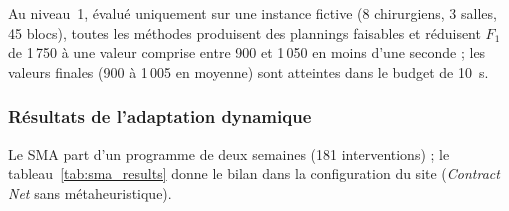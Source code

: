 \documentclass[11pt,a4paper]{article}
\begin{document}
Au niveau~1, évalué uniquement sur une instance fictive (8 chirurgiens, 3 salles, 45 blocs), toutes les méthodes produisent des plannings faisables et réduisent $F_1$ de 1\,750 à une valeur comprise entre 900 et 1\,050 en moins d'une seconde ; les valeurs finales (900 à 1\,005 en moyenne) sont atteintes dans le budget de 10~s.

\subsubsection{Résultats de l'adaptation dynamique}

Le SMA part d'un programme de deux semaines (181 interventions) ; le tableau~\ref{tab:sma_results} donne le bilan dans la configuration du site (\emph{Contract Net} sans métaheuristique).

\begin{table}[htbp]
\centering
\caption{Bilan du SMA sur une sélection de scénarios (configuration du site ; scénarios aléatoires : sommes sur les graines abouties). Total sur les 21 scénarios déterministes : 23 urgences, 21 dans le délai, 1 confiée à la garde, 1 transfert proposé, 26 patients décalés, 54 reportés, 8 en liste d'attente}
\label{tab:sma_results}
\footnotesize
{}
\end{table}
\end{document}
